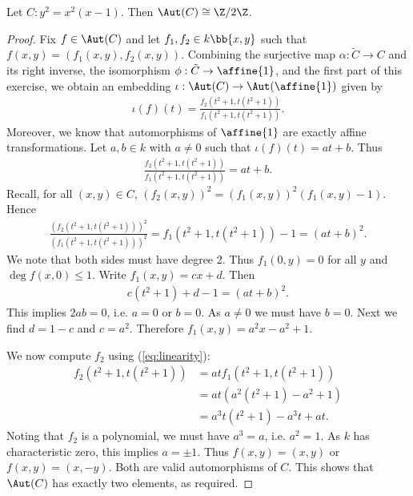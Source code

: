 \documentclass{article}
\begin{document}
\begin{claim*}[3]
  Let $C:y^2=x^2(x-1)$. Then $\Aut(C)\cong \Z/2\Z$.
  \begin{proof}
    Fix $f\in\Aut(C)$ and let $f_1,f_2\in k\bb{x,y}$ such that $f(x,y) = (f_1(x,y),f_2(x,y))$.
    Combining the surjective map $\alpha:\tilde C\to C$ and its right inverse, the 
    isomorphism $\phi:\tilde C\to\affine{1}$, and the first part of this exercise,
    we obtain an embedding $\iota:\Aut(C)\to\Aut(\affine{1})$ given by
    \begin{align*}
      \iota(f)(t) = \frac{f_2(t^2+1,t(t^2+1))}{f_1(t^2+1,t(t^2+1))}.
    \end{align*}
    Moreover, we know that automorphisms of $\affine{1}$ are exactly affine transformations.
    Let $a,b\in k$ with $a\neq 0$ such that
    $\iota(f)(t) = a t + b$. Thus
    \begin{align}\label{eq:linearity}
      \frac{f_2(t^2+1,t(t^2+1))}{f_1(t^2+1,t(t^2+1))} = at+b.
    \end{align}
    Recall, for all $(x,y)\in C$, $(f_2(x,y))^2 = (f_1(x,y))^2(f_1(x,y) - 1)$. Hence
    \begin{align*}
      \frac{(f_2(t^2+1,t(t^2+1)))^2}{(f_1(t^2+1,t(t^2+1)))^2}
      = f_1(t^2+1,t(t^2+1))-1 = (at + b)^2.
    \end{align*}
    We note that both sides must have degree 2. Thus $f_1(0,y)=0$ for all $y$
    and $\deg f(x,0)\leq 1$. Write $f_1(x,y) = cx + d$. Then
    \begin{align*}
      c(t^2+1) + d - 1 = (at+b)^2.
    \end{align*}
    This implies $2ab=0$, i.e. $a=0$ or $b=0$. As $a\neq 0$ we must have $b=0$. Next we
    find $d = 1 - c$ and $c=a^2$. Therefore $f_1(x,y)=a^2x - a^2 + 1$.

    We now compute $f_2$ using (\ref{eq:linearity}):
    \begin{align*}
      f_2(t^2+1,t(t^2+1)) &= a t f_1(t^2+1,t(t^2+1))\\
                          &= a t (a^2 (t^2+1) - a^2 + 1)\\
                          &= a^3 t(t^2+1) - a^3t + a t.
    \end{align*}
    Noting that $f_2$ is a polynomial, we must have $a^3 = a$, i.e. $a^2=1$. As $k$
    has characteristic zero, this implies $a=\pm 1$. Thus $f(x,y)=(x, y)$
    or $f(x,y)=(x,-y)$. Both are valid automorphisms of $C$. This shows that $\Aut(C)$
    has exactly two elements, as required.
  \end{proof}
\end{claim*}
\end{document}
